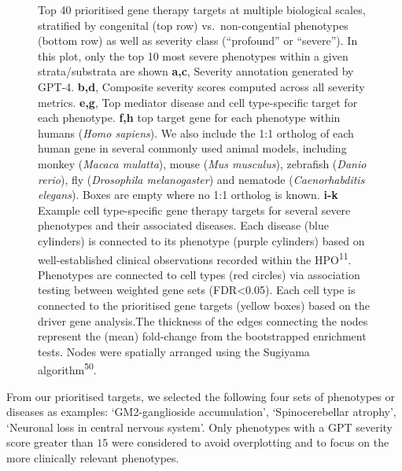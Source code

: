 \documentclass[
]{report}
\begin{document}
\begin{figure}[H]
\caption{\label{fig-therapy-examplesD08295A6-16DC-499D-85A8-8BA656E013A2}Top
40 prioritised gene therapy targets at multiple biological scales,
stratified by congenital (top row) vs.~non-congential phenotypes (bottom
row) as well as severity class (``profound'' or ``severe''). In this
plot, only the top 10 most severe phenotypes within a given
strata/substrata are shown \textbf{a,c}, Severity annotation generated
by GPT-4. \textbf{b,d}, Composite severity scores computed across all
severity metrics. \textbf{e,g}, Top mediator disease and cell
type-specific target for each phenotype. \textbf{f,h} top target gene
for each phenotype within humans (\emph{Homo sapiens}). We also include
the 1:1 ortholog of each human gene in several commonly used animal
models, including monkey (\emph{Macaca mulatta}), mouse (\emph{Mus
musculus}), zebrafish (\emph{Danio rerio}), fly (\emph{Drosophila
melanogaster}) and nematode (\emph{Caenorhabditis elegans}). Boxes are
empty where no 1:1 ortholog is known. \textbf{i-k} Example cell
type-specific gene therapy targets for several severe phenotypes and
their associated diseases. Each disease (blue cylinders) is connected to
its phenotype (purple cylinders) based on well-established clinical
observations recorded within the HPO\textsuperscript{11}. Phenotypes are
connected to cell types (red circles) via association testing between
weighted gene sets (FDR\textless0.05). Each cell type is connected to
the prioritised gene targets (yellow boxes) based on the driver gene
analysis.The thickness of the edges connecting the nodes represent the
(mean) fold-change from the bootstrapped enrichment tests. Nodes were
spatially arranged using the Sugiyama algorithm\textsuperscript{50}.}

\end{figure}%

From our prioritised targets, we selected the following four sets of
phenotypes or diseases as examples: `GM2-ganglioside accumulation',
`Spinocerebellar atrophy', `Neuronal loss in central nervous system'.
Only phenotypes with a GPT severity score greater than \(15\) were
considered to avoid overplotting and to focus on the more clinically
relevant phenotypes.
\end{document}
